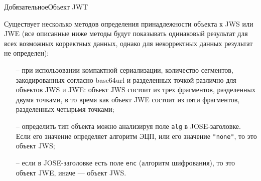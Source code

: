\begin{appendix}{Д}{обязательное}{Объект JWT}


Существует несколько методов определения принадлежности объекта к JWS или JWE
(все описанные ниже методы будут показывать одинаковый результат 
для всех возможных корректных данных,
однако для некорректных данных результат не определен):

%       
% 

\begin{itemize}
\item[--] 
при использовании компактной сериализации, количество сегментов,
закодированных согласно base64url и разделенных точкой различно для объектов 
JWS и JWE:  
объект JWS состоит из трех фрагментов, разделенных двумя точками, в то время как 
объект JWE состоит из пяти фрагментов, разделенных четырьмя точками;
\item[--] 
определить тип объекта можно анализируя поле \lstinline{alg} в JOSE-заголовке. 
Если его значение определяет алгоритм ЭЦП, или его значение 
\lstinline{"none"}, то это объект JWS;
\item[--] 
если в JOSE-заголовке есть поле \lstinline{enc} (алгоритм шифрования), 
то это объект JWE, иначе --- объект JWS.
\end{itemize}


\end{appendix}
